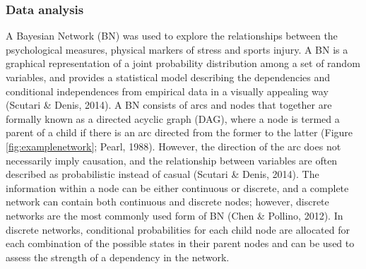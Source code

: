 \documentclass[man,floatsintext]{apa6}
\begin{document}
\hypertarget{data-analysis}{%
\subsubsection{Data analysis}\label{data-analysis}}

A Bayesian Network (BN) was used to explore the relationships between the psychological measures, physical markers of stress and sports injury.
A BN is a graphical representation of a joint probability distribution among a set of random variables, and provides a statistical model describing the dependencies and conditional independences from empirical data in a visually appealing way (Scutari \& Denis, 2014).
A BN consists of arcs and nodes that together are formally known as a directed acyclic graph (DAG), where a node is termed a parent of a child if there is an arc directed from the former to the latter (Figure \ref{fig:examplenetwork}; Pearl, 1988).
However, the direction of the arc does not necessarily imply causation, and the relationship between variables are often described as probabilistic instead of casual (Scutari \& Denis, 2014).
The information within a node can be either continuous or discrete, and a complete network can contain both continuous and discrete nodes; however, discrete networks are the most commonly used form of BN (Chen \& Pollino, 2012).
In discrete networks, conditional probabilities for each child node are allocated for each combination of the possible states in their parent nodes and can be used to assess the strength of a dependency in the network.
\end{document}
